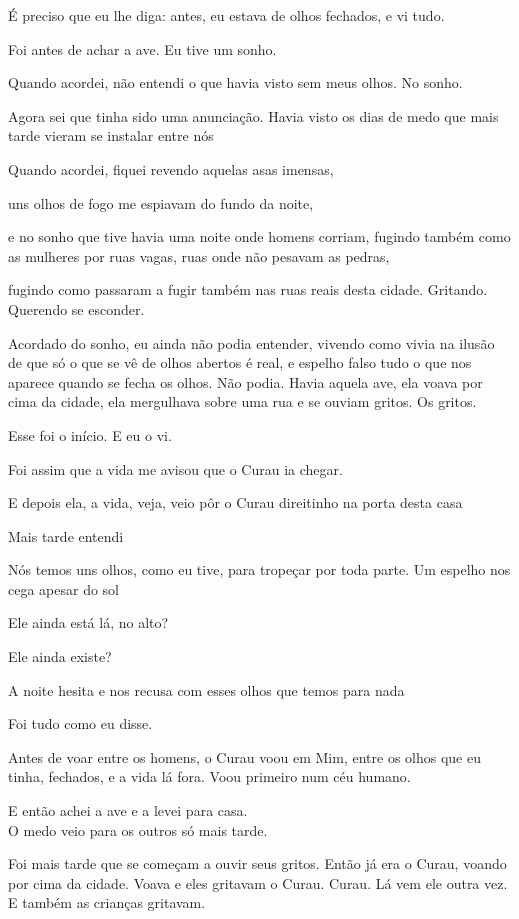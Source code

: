 É preciso que eu lhe diga: antes, eu estava de olhos fechados, e vi
tudo.

Foi antes de achar a ave. Eu tive um sonho.

Quando acordei, não entendi o que havia visto sem meus olhos. No sonho.

Agora sei que tinha sido uma anunciação. Havia visto os dias de medo que
mais tarde vieram se instalar entre nós

Quando acordei, fiquei revendo aquelas asas imensas,

uns olhos de fogo me espiavam do fundo da noite,

e no sonho que tive havia uma noite onde homens corriam, fugindo também
como as mulheres por ruas vagas, ruas onde não pesavam as pedras,

fugindo como passaram a fugir também nas ruas reais desta cidade.
Gritando. Querendo se esconder.

Acordado do sonho, eu ainda não podia entender, vivendo como vivia na
ilusão de que só o que se vê de olhos abertos é real, e espelho falso
tudo o que nos aparece quando se fecha os olhos. Não podia. Havia aquela
ave, ela voava por cima da cidade, ela mergulhava sobre uma rua e se
ouviam gritos. Os gritos.

Esse foi o início. E eu o vi.

Foi assim que a vida me avisou que o Curau ia chegar.

E depois ela, a vida, veja, veio pôr o Curau direitinho na porta desta
casa

Mais tarde entendi

Nós temos uns olhos, como eu tive, para tropeçar por toda parte. Um
espelho nos cega apesar do sol

Ele ainda está lá, no alto?

Ele ainda existe?

A noite hesita e nos recusa com esses olhos que temos para nada

Foi tudo como eu disse.

Antes de voar entre os homens, o Curau voou em Mim, entre os olhos que
eu tinha, fechados, e a vida lá fora. Voou primeiro num céu humano.

E então achei a ave e a levei para casa.\\

O medo veio para os outros só mais tarde.

Foi mais tarde que se começam a ouvir seus gritos. Então já era o Curau,
voando por cima da cidade. Voava e eles gritavam o Curau. Curau. Lá vem
ele outra vez. E também as crianças gritavam.

